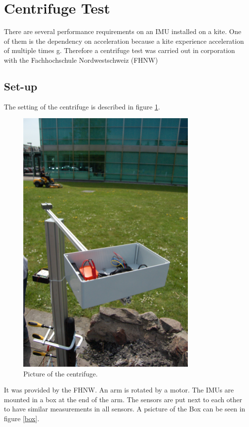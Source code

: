 \section{Centrifuge Test}
There are several performance requirements on an IMU installed on a kite. One of them is the dependency on acceleration because a kite experience acceleration of multiple times g. Therefore a centrifuge test was carried out in corporation with the Fachhochschule Nordwestschweiz (FHNW)
\subsection{Set-up}
The setting of the centrifuge is described in figure \ref{centrifuge}.
\begin{figure}[hb]
\begin{center}
\includegraphics[width=0.8\textwidth]{pictures/centrifuge.JPG}
\caption{Picture of the centrifuge.}
\label{centrifuge}
\end{center}
\end{figure}
It was provided by the FHNW. An arm is rotated by a motor. The IMUs are mounted in a box at the end of the arm. The sensors are put next to each other to have similar measurements in all sensors. A psicture of the Box can be seen in figure \ref{box}. 
